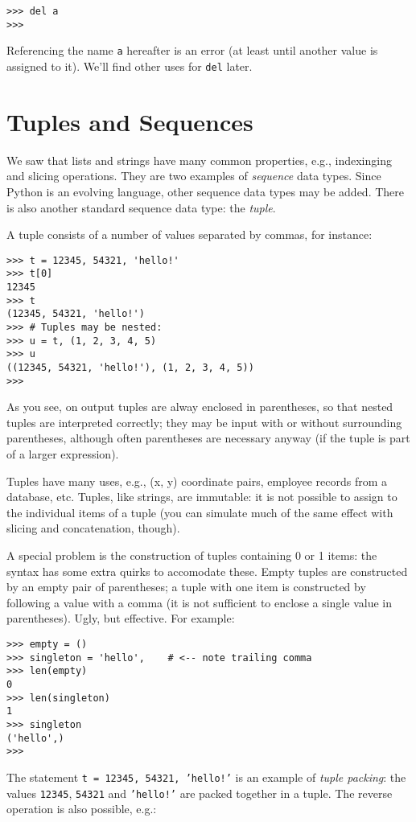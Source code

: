 \bcode\begin{verbatim}
>>> del a
>>>
\end{verbatim}\ecode
%
Referencing the name {\tt a} hereafter is an error (at least until
another value is assigned to it).  We'll find other uses for {\tt del}
later.

\section{Tuples and Sequences}

We saw that lists and strings have many common properties, e.g.,
indexinging and slicing operations.  They are two examples of {\em
sequence} data types.  Since Python is an evolving language, other
sequence data types may be added.  There is also another standard
sequence data type: the {\em tuple}.

A tuple consists of a number of values separated by commas, for
instance:

\bcode\begin{verbatim}
>>> t = 12345, 54321, 'hello!'
>>> t[0]
12345
>>> t
(12345, 54321, 'hello!')
>>> # Tuples may be nested:
>>> u = t, (1, 2, 3, 4, 5)
>>> u
((12345, 54321, 'hello!'), (1, 2, 3, 4, 5))
>>>
\end{verbatim}\ecode
%
As you see, on output tuples are alway enclosed in parentheses, so
that nested tuples are interpreted correctly; they may be input with
or without surrounding parentheses, although often parentheses are
necessary anyway (if the tuple is part of a larger expression).

Tuples have many uses, e.g., (x, y) coordinate pairs, employee records
from a database, etc.  Tuples, like strings, are immutable: it is not
possible to assign to the individual items of a tuple (you can
simulate much of the same effect with slicing and concatenation,
though).

A special problem is the construction of tuples containing 0 or 1
items: the syntax has some extra quirks to accomodate these.  Empty
tuples are constructed by an empty pair of parentheses; a tuple with
one item is constructed by following a value with a comma
(it is not sufficient to enclose a single value in parentheses).
Ugly, but effective.  For example:

\bcode\begin{verbatim}
>>> empty = ()
>>> singleton = 'hello',    # <-- note trailing comma
>>> len(empty)
0
>>> len(singleton)
1
>>> singleton
('hello',)
>>>
\end{verbatim}\ecode
%
The statement {\tt t = 12345, 54321, 'hello!'} is an example of {\em
tuple packing}: the values {\tt 12345}, {\tt 54321} and {\tt 'hello!'}
are packed together in a tuple.  The reverse operation is also
possible, e.g.:


